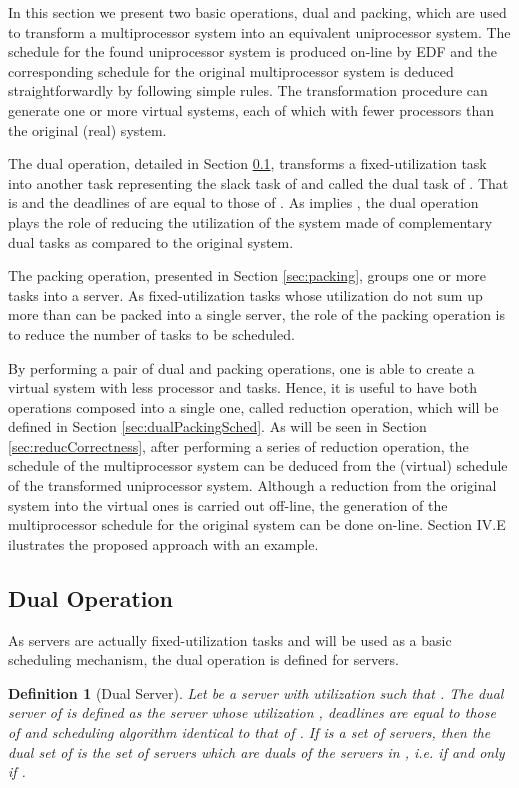 \documentclass[twocolumn, compsocconf]{IEEEtran}
\newtheorem{definition}{Definition}[section]
\newcounter{proc}
\begin{document}
In this section we present two basic operations, dual and packing, which are
used to transform a multiprocessor system into an equivalent uniprocessor
system. The schedule for the found uniprocessor system is produced on-line by
EDF and the corresponding schedule for the original multiprocessor system is
deduced straightforwardly by following simple rules. The transformation
procedure can generate one or more virtual systems, each of which with fewer
processors than the original (real) system.

The dual operation, detailed in Section \ref{sec:dualSched}, transforms a
fixed-utilization task  into another task  representing the slack
task of  and called the dual task of . That is  and the deadlines of  are equal to those of . As
 implies , the dual operation plays the
role of reducing the utilization of the system made of complementary dual tasks
as compared to the original system.

The packing operation, presented in Section \ref{sec:packing}, groups one or
more tasks into a server. As fixed-utilization tasks whose utilization do not
sum up more than  can be packed into a single server, the role of the packing
operation is to reduce the number of tasks to be scheduled.

By performing a pair of dual and packing operations, one is able to create a
virtual system with less processor and tasks. Hence, it is useful to have both
operations composed into a single one, called reduction operation, which will be
defined in Section \ref{sec:dualPackingSched}. As will be seen in Section
\ref{sec:reducCorrectness}, after performing a series of reduction operation,
the schedule of the multiprocessor system can be deduced from the (virtual)
schedule of the transformed uniprocessor system. Although a reduction from the
original system into the virtual ones is carried out off-line, the generation of
the multiprocessor schedule for the original system can be done on-line.
Section IV.E ilustrates the proposed approach with an example.

\subsection{Dual Operation}\label{sec:dualSched}

As servers are actually fixed-utilization tasks and will be used as a basic
scheduling mechanism, the dual operation is defined for servers.

\begin{definition}[Dual Server]\label{dfn:dualServer}
  Let  be a server with utilization  such that . The dual server of  is defined as the server  whose utilization
  , deadlines are equal to those of  and
  scheduling algorithm identical to that of . If  is a set of
  servers, then the dual set  of  is the set of servers
  which are duals of the servers in , i.e.  if and
  only if .
\end{definition}
\end{document}
